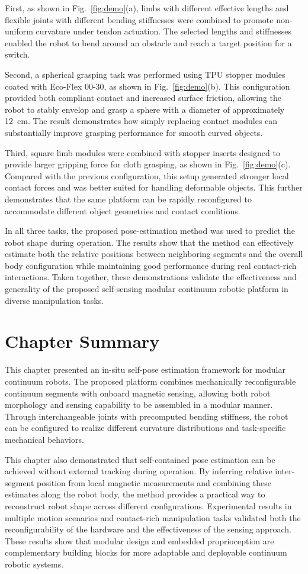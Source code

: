 First, as shown in Fig.~\ref{fig:demo}(a), limbs with different effective lengths and flexible joints with different bending stiffnesses were combined to promote non-uniform curvature under tendon actuation. The selected lengths and stiffnesses enabled the robot to bend around an obstacle and reach a target position for a switch.

Second, a spherical grasping task was performed using TPU stopper modules coated with Eco-Flex 00-30, as shown in Fig.~\ref{fig:demo}(b). This configuration provided both compliant contact and increased surface friction, allowing the robot to stably envelop and grasp a sphere with a diameter of approximately 12~cm. The result demonstrates how simply replacing contact modules can substantially improve grasping performance for smooth curved objects.

Third, square limb modules were combined with stopper inserts designed to provide larger gripping force for cloth grasping, as shown in Fig.~\ref{fig:demo}(c). Compared with the previous configuration, this setup generated stronger local contact forces and was better suited for handling deformable objects. This further demonstrates that the same platform can be rapidly reconfigured to accommodate different object geometries and contact conditions.

In all three tasks, the proposed pose-estimation method was used to predict the robot shape during operation. The results show that the method can effectively estimate both the relative positions between neighboring segments and the overall body configuration while maintaining good performance during real contact-rich interactions. Taken together, these demonstrations validate the effectiveness and generality of the proposed self-sensing modular continuum robotic platform in diverse manipulation tasks.

\section{Chapter Summary}

This chapter presented an in-situ self-pose estimation framework for modular continuum robots. The proposed platform combines mechanically reconfigurable continuum segments with onboard magnetic sensing, allowing both robot morphology and sensing capability to be assembled in a modular manner. Through interchangeable joints with precomputed bending stiffness, the robot can be configured to realize different curvature distributions and task-specific mechanical behaviors.

This chapter also demonstrated that self-contained pose estimation can be achieved without external tracking during operation. By inferring relative inter-segment position from local magnetic measurements and combining these estimates along the robot body, the method provides a practical way to reconstruct robot shape across different configurations. Experimental results in multiple motion scenarios and contact-rich manipulation tasks validated both the reconfigurability of the hardware and the effectiveness of the sensing approach. These results show that modular design and embedded proprioception are complementary building blocks for more adaptable and deployable continuum robotic systems.
